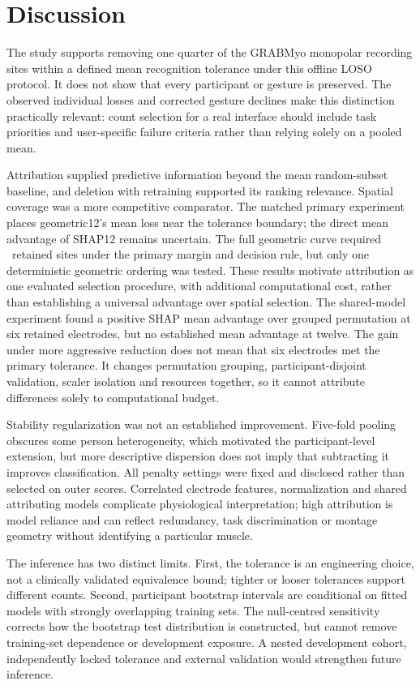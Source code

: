 \section{Discussion}
The study supports removing one quarter of the GRABMyo monopolar recording sites within a defined mean recognition tolerance under this offline LOSO protocol. It does not show that every participant or gesture is preserved. The observed individual losses and corrected gesture declines make this distinction practically relevant: count selection for a real interface should include task priorities and user-specific failure criteria rather than relying solely on a pooled mean.

Attribution supplied predictive information beyond the mean random-subset baseline, and deletion with retraining supported its ranking relevance. Spatial coverage was a more competitive comparator. The matched primary experiment places geometric12's mean loss near the tolerance boundary; the direct mean advantage of SHAP12 remains uncertain. The full geometric curve required \RevGeomKStarCI\ retained sites under the primary margin and decision rule, but only one deterministic geometric ordering was tested. These results motivate attribution as one evaluated selection procedure, with additional computational cost, rather than establishing a universal advantage over spatial selection. The shared-model experiment found a positive SHAP mean advantage over grouped permutation at six retained electrodes, but no established mean advantage at twelve. The gain under more aggressive reduction does not mean that six electrodes met the primary tolerance. It changes permutation grouping, participant-disjoint validation, scaler isolation and resources together, so it cannot attribute differences solely to computational budget.

Stability regularization was not an established improvement. Five-fold pooling obscures some person heterogeneity, which motivated the participant-level extension, but more descriptive dispersion does not imply that subtracting it improves classification. All penalty settings were fixed and disclosed rather than selected on outer scores. Correlated electrode features, normalization and shared attributing models complicate physiological interpretation; high attribution is model reliance and can reflect redundancy, task discrimination or montage geometry without identifying a particular muscle.

The inference has two distinct limits. First, the tolerance is an engineering choice, not a clinically validated equivalence bound; tighter or looser tolerances support different counts. Second, participant bootstrap intervals are conditional on fitted models with strongly overlapping training sets. The null-centred sensitivity corrects how the bootstrap test distribution is constructed, but cannot remove training-set dependence or development exposure. A nested development cohort, independently locked tolerance and external validation would strengthen future inference.

